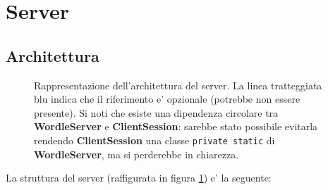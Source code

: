 \section{Server}

\subsection{Architettura}

\begin{center}
	\begin{figure}[t]
		\caption{Rappresentazione dell'architettura del server. La linea tratteggiata blu indica che il riferimento e' opzionale (potrebbe non essere presente). Si noti che esiste una dipendenza circolare tra \textbf{WordleServer} e \textbf{ClientSession}: sarebbe stato possibile evitarla rendendo \textbf{ClientSession} una classe \texttt{private static} di \textbf{WordleServer}, ma si perderebbe in chiarezza.}
		\label{fig:server_arch}
	\end{figure}
\end{center}

La struttura del server (raffigurata in figura \ref{fig:server_arch}) e' la seguente:
\bigskip

